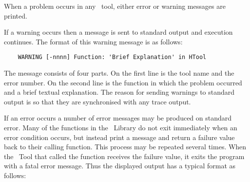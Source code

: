 %
%


When a problem occurs in any \HTK\ tool, either
error
or warning messages are printed.  

If a warning occurs then a message is sent to standard output and
execution continues. The format of this warning message is as follows:
\begin{verbatim}
    WARNING [-nnnn] Function: 'Brief Explanation' in HTool
\end{verbatim}

The message consists of four parts.  On the first line is the tool name and the error number.
On the second line is the function in which the
problem occurred and a brief textual explanation.
The reason for sending warnings to standard output is so that they are 
synchronised with any trace output.

If an error occurs a number of error messages may be produced on
standard error. Many of the functions in the \HTK\ Library do not exit
immediately when an error condition occurs, but instead print a message and return a failure
value back to their calling function. This process may be repeated several
times. When the \HTK\ Tool that called the function receives the failure
value, it exits the program with a fatal error message. Thus the
displayed output has a typical format as follows:

